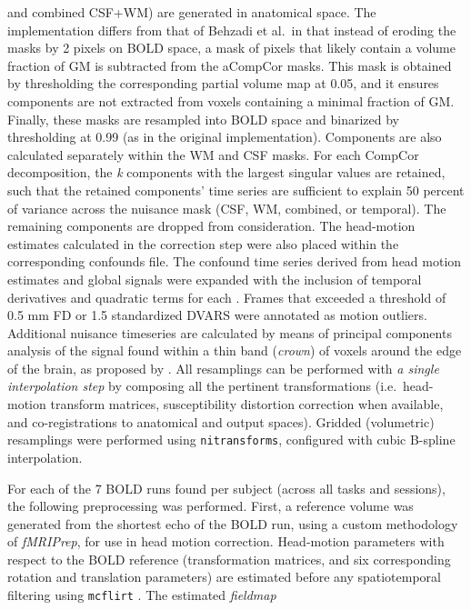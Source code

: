 \documentclass[
]{article}
\begin{document}
\begin{description}
and combined CSF+WM) are generated in anatomical space. The
implementation differs from that of Behzadi et al.~in that instead of
eroding the masks by 2 pixels on BOLD space, a mask of pixels that
likely contain a volume fraction of GM is subtracted from the aCompCor
masks. This mask is obtained by thresholding the corresponding partial
volume map at 0.05, and it ensures components are not extracted from
voxels containing a minimal fraction of GM. Finally, these masks are
resampled into BOLD space and binarized by thresholding at 0.99 (as in
the original implementation). Components are also calculated separately
within the WM and CSF masks. For each CompCor decomposition, the
\emph{k} components with the largest singular values are retained, such
that the retained components' time series are sufficient to explain 50
percent of variance across the nuisance mask (CSF, WM, combined, or
temporal). The remaining components are dropped from consideration. The
head-motion estimates calculated in the correction step were also placed
within the corresponding confounds file. The confound time series
derived from head motion estimates and global signals were expanded with
the inclusion of temporal derivatives and quadratic terms for each
\citep{confounds_satterthwaite_2013}. Frames that exceeded a threshold
of 0.5 mm FD or 1.5 standardized DVARS were annotated as motion
outliers. Additional nuisance timeseries are calculated by means of
principal components analysis of the signal found within a thin band
(\emph{crown}) of voxels around the edge of the brain, as proposed by
\citep{patriat_improved_2017}. All resamplings can be performed with
\emph{a single interpolation step} by composing all the pertinent
transformations (i.e.~head-motion transform matrices, susceptibility
distortion correction when available, and co-registrations to anatomical
and output spaces). Gridded (volumetric) resamplings were performed
using \texttt{nitransforms}, configured with cubic B-spline
interpolation.
\item[Functional data preprocessing]
For each of the 7 BOLD runs found per subject (across all tasks and
sessions), the following preprocessing was performed. First, a reference
volume was generated from the shortest echo of the BOLD run, using a
custom methodology of \emph{fMRIPrep}, for use in head motion
correction. Head-motion parameters with respect to the BOLD reference
(transformation matrices, and six corresponding rotation and translation
parameters) are estimated before any spatiotemporal filtering using
\texttt{mcflirt} \citep[FSL ,][]{mcflirt}. The estimated \emph{fieldmap}

\end{description}
\end{document}
